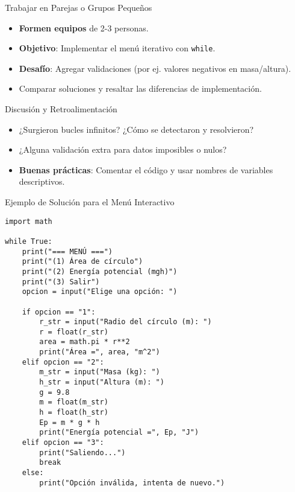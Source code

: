 \documentclass[10pt]{beamer}
\begin{document}
\begin{frame}{Trabajar en Parejas o Grupos Pequeños}
  \begin{itemize}
    \item \textbf{Formen equipos} de 2-3 personas.
    \item \textbf{Objetivo}: Implementar el menú iterativo con \texttt{while}.
    \item \textbf{Desafío}: Agregar validaciones (por ej. valores negativos en masa/altura).
    \item Comparar soluciones y resaltar las diferencias de implementación.
  \end{itemize}
\end{frame}

\begin{frame}{Discusión y Retroalimentación}
  \begin{itemize}
    \item ¿Surgieron bucles infinitos? ¿Cómo se detectaron y resolvieron?
    \item ¿Alguna validación extra para datos imposibles o nulos?
    \item \textbf{Buenas prácticas}: Comentar el código y usar nombres de variables descriptivos.
  \end{itemize}
\end{frame}

\begin{frame}[fragile]{Ejemplo de Solución para el Menú Interactivo}
\begin{verbatim}
import math

while True:
    print("=== MENÚ ===")
    print("(1) Área de círculo")
    print("(2) Energía potencial (mgh)")
    print("(3) Salir")
    opcion = input("Elige una opción: ")

    if opcion == "1":
        r_str = input("Radio del círculo (m): ")
        r = float(r_str)
        area = math.pi * r**2
        print("Área =", area, "m^2")
    elif opcion == "2":
        m_str = input("Masa (kg): ")
        h_str = input("Altura (m): ")
        g = 9.8
        m = float(m_str)
        h = float(h_str)
        Ep = m * g * h
        print("Energía potencial =", Ep, "J")
    elif opcion == "3":
        print("Saliendo...")
        break
    else:
        print("Opción inválida, intenta de nuevo.")
\end{verbatim}
\end{frame}
\end{document}
